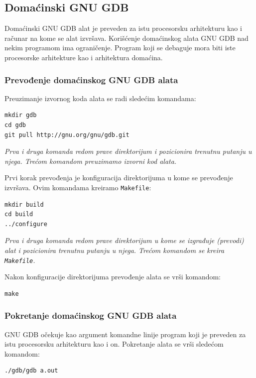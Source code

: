 \documentclass[12pt,oneside]{memoir}
\begin{document}
\subsection{Domaćinski GNU GDB}

Domaćinski GNU GDB alat je preveden za istu procesorsku arhitekturu kao i računar na kome se alat izvršava. Korišćenje domaćinskog alata GNU GDB nad nekim programom ima ograničenje. Program koji se debaguje mora biti iste procesorske arhitekture kao i arhitektura domaćina.

\subsubsection{Prevođenje domaćinskog GNU GDB alata}

Preuzimanje izvornog koda alata se radi sledećim komandama:
\begin{lstlisting}
mkdir gdb
cd gdb
git pull http://gnu.org/gnu/gdb.git

\end{lstlisting}
\emph{Prva i druga komanda redom prave direktorijum i pozicionira trenutnu putanju u njega. Trećom komandom preuzimamo izvorni kod alata.}

Prvi korak prevođenja je konfiguracija direktorijuma u kome se prevođenje izvršava. Ovim komandama kreiramo \texttt{Makefile}:
\begin{lstlisting}
mkdir build
cd build
../configure

\end{lstlisting}
\emph{Prva i druga komanda redom prave direktorijum u kome se izgrađuje (prevodi) alat i pozicionira trenutnu putanju u njega. Trećom komandom se kreira \texttt{Makefile}.}

Nakon konfiguracije direktorijuma prevođenje alata se vrši komandom:
\begin{lstlisting}
make

\end{lstlisting}

\subsubsection{Pokretanje domaćinskog GNU GDB alata}

GNU GDB očekuje kao argument komandne linije program koji je preveden za istu procesorsku arhitekturu kao i on. Pokretanje alata se vrši sledećom komandom:
\begin{lstlisting}
./gdb/gdb a.out

\end{lstlisting}
\end{document}
